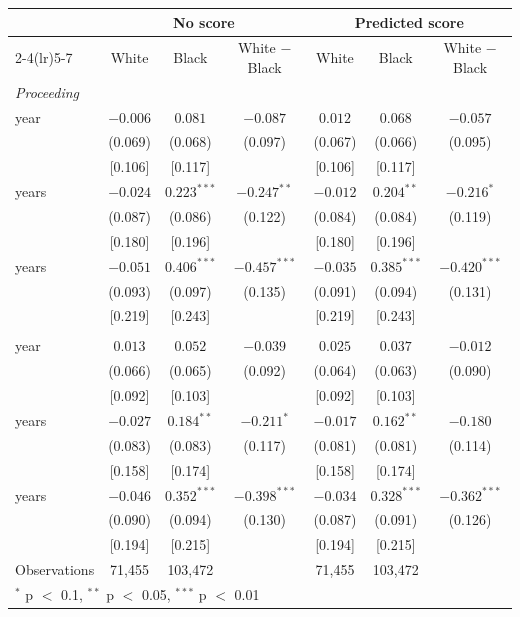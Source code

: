 \begin{tabular}{lcccccc}
\toprule
 & \multicolumn{3}{c}{No score} & \multicolumn{3}{c}{Predicted score} \\
\cmidrule(lr){2-4}\cmidrule(lr){5-7}
 & White & Black & White $-$ Black & White & Black & White $-$ Black \\
\midrule
\multicolumn{7}{l}{\textit{Proceeding}} \\
\quad 1 year & $-0.006$ & $0.081$ & $-0.087$ & $0.012$ & $0.068$ & $-0.057$ \\
 & (0.069) & (0.068) & (0.097) & (0.067) & (0.066) & (0.095) \\
 & [0.106] & [0.117] &  & [0.106] & [0.117] &  \\
\quad 2 years & $-0.024$ & $0.223^{***}$ & $-0.247^{**}$ & $-0.012$ & $0.204^{**}$ & $-0.216^{*}$ \\
 & (0.087) & (0.086) & (0.122) & (0.084) & (0.084) & (0.119) \\
 & [0.180] & [0.196] &  & [0.180] & [0.196] &  \\
\quad 3 years & $-0.051$ & $0.406^{***}$ & $-0.457^{***}$ & $-0.035$ & $0.385^{***}$ & $-0.420^{***}$ \\
 & (0.093) & (0.097) & (0.135) & (0.091) & (0.094) & (0.131) \\
 & [0.219] & [0.243] &  & [0.219] & [0.243] &  \\
\addlinespace
\multicolumn{7}{l}{\textit{Revoked}} \\
\quad 1 year & $0.013$ & $0.052$ & $-0.039$ & $0.025$ & $0.037$ & $-0.012$ \\
 & (0.066) & (0.065) & (0.092) & (0.064) & (0.063) & (0.090) \\
 & [0.092] & [0.103] &  & [0.092] & [0.103] &  \\
\quad 2 years & $-0.027$ & $0.184^{**}$ & $-0.211^{*}$ & $-0.017$ & $0.162^{**}$ & $-0.180$ \\
 & (0.083) & (0.083) & (0.117) & (0.081) & (0.081) & (0.114) \\
 & [0.158] & [0.174] &  & [0.158] & [0.174] &  \\
\quad 3 years & $-0.046$ & $0.352^{***}$ & $-0.398^{***}$ & $-0.034$ & $0.328^{***}$ & $-0.362^{***}$ \\
 & (0.090) & (0.094) & (0.130) & (0.087) & (0.091) & (0.126) \\
 & [0.194] & [0.215] &  & [0.194] & [0.215] &  \\
\midrule
Observations & 71,455 & 103,472 &  & 71,455 & 103,472 &  \\
\bottomrule
\multicolumn{7}{l}{\footnotesize $^{*}$ p $<$ 0.1, $^{**}$ p $<$ 0.05, $^{***}$ p $<$ 0.01} \\
\end{tabular}
